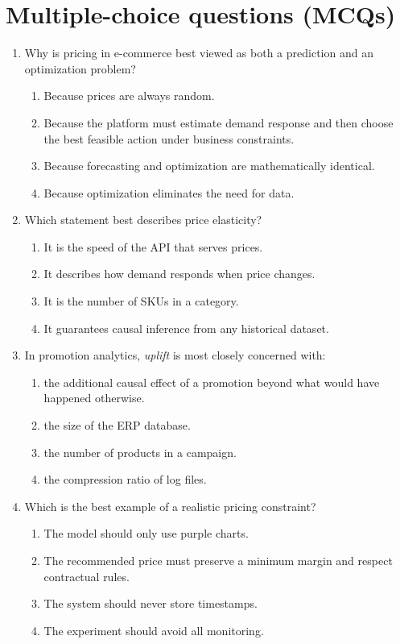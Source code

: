\section{Multiple-choice questions (MCQs)}
\begin{enumerate}
  \item Why is pricing in e-commerce best viewed as both a prediction and an optimization problem?
  \begin{enumerate}
    \item Because prices are always random.
    \item Because the platform must estimate demand response and then choose the best feasible action under business constraints.
    \item Because forecasting and optimization are mathematically identical.
    \item Because optimization eliminates the need for data.
  \end{enumerate}

  \item Which statement best describes price elasticity?
  \begin{enumerate}
    \item It is the speed of the API that serves prices.
    \item It describes how demand responds when price changes.
    \item It is the number of SKUs in a category.
    \item It guarantees causal inference from any historical dataset.
  \end{enumerate}

  \item In promotion analytics, \emph{uplift} is most closely concerned with:
  \begin{enumerate}
    \item the additional causal effect of a promotion beyond what would have happened otherwise.
    \item the size of the ERP database.
    \item the number of products in a campaign.
    \item the compression ratio of log files.
  \end{enumerate}

  \item Which is the best example of a realistic pricing constraint?
  \begin{enumerate}
    \item The model should only use purple charts.
    \item The recommended price must preserve a minimum margin and respect contractual rules.
    \item The system should never store timestamps.
    \item The experiment should avoid all monitoring.
  \end{enumerate}


\end{enumerate}
